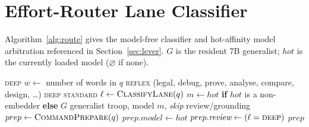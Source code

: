 \documentclass[sigconf,nonacm,10pt]{acmart}
\begin{document}
\appendix
\section{Effort-Router Lane Classifier}
\label{sec:appendix-router}
Algorithm~\ref{alg:route} gives the model-free classifier and hot-affinity
model arbitration referenced in Section~\ref{sec:lever}. $G$ is the resident
7B generalist; $hot$ is the currently loaded model ($\varnothing$ if none).

\begin{algorithm}[h]
\caption{Effort routing: lane classification (\textsc{ClassifyLane}) and
hot-affinity model arbitration (\textsc{RouteEffort}).}
\label{alg:route}
\small
\begin{algorithmic}[1]
     \State \Return \textsc{deep}
  \EndIf
  \State $w \gets$ number of words in $q$
     \State \Return \textsc{reflex}
  \EndIf
     \Statex \hfill{\footnotesize(legal, debug, prove, analyse, compare, design, \dots)}
     \State \Return \textsc{deep}
  \EndIf
  \State \Return \textsc{standard}
\EndProcedure
\Statex
{}
  \State $\ell \gets \Call{ClassifyLane}{q}$
     \State $m \gets hot$ \textbf{if} $hot$ is a non-embedder \textbf{else} $G$
     \State \Return generalist troop, model $m$, \emph{skip} review/grounding
  \EndIf
  \State $prep \gets \Call{CommandPrepare}{q}$
     \State $prep.\textit{model} \gets hot$
  \EndIf
  \State $prep.\textit{review} \gets (\ell = \textsc{deep})$
  \State \Return $prep$
\EndProcedure
\end{algorithmic}
\end{algorithm}



\end{document}
